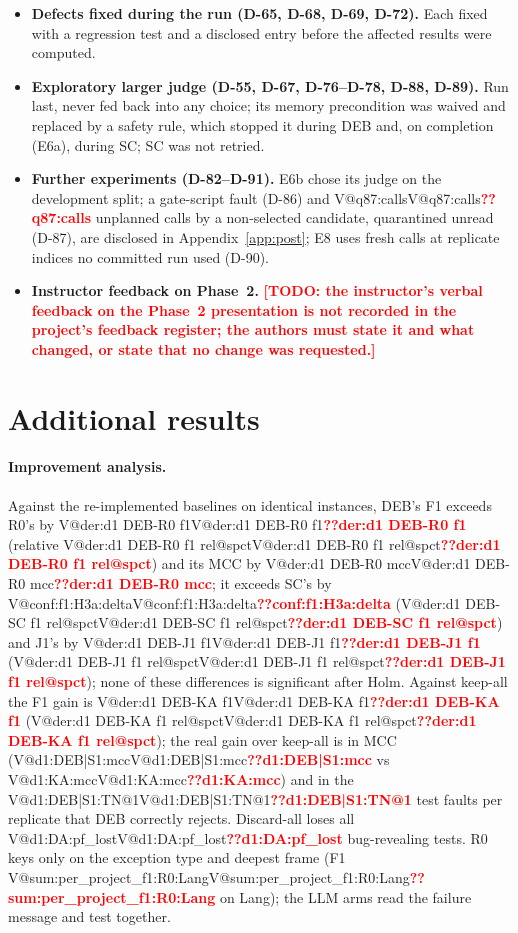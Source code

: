 \documentclass[pdflatex,iicol,sn-mathphys-num]{sn-jnl}
\makeatletter
\newcommand{\V}[1]{\ifcsname V@#1\endcsname\csname V@#1\endcsname\else\textbf{\textcolor{red}{??#1}}\fi}
\newcommand{\TODO}[1]{\textbf{\textcolor{red}{[TODO: #1]}}}
\makeatother
\begin{document}
\begin{appendices}
\begin{itemize}
\item \textbf{Defects fixed during the run (D-65, D-68, D-69, D-72).} Each fixed with a regression test and a disclosed entry before the affected results were computed.
\item \textbf{Exploratory larger judge (D-55, D-67, D-76--D-78, D-88, D-89).} Run last, never fed back into any choice; its memory precondition was waived and replaced by a safety rule, which stopped it during DEB and, on completion (E6a), during SC; SC was not retried.
\item \textbf{Further experiments (D-82--D-91).} E6b chose its judge on the development split; a gate-script fault (D-86) and \V{q87:calls} unplanned calls by a non-selected candidate, quarantined unread (D-87), are disclosed in Appendix~\ref{app:post}; E8 uses fresh calls at replicate indices no committed run used (D-90).
\item \textbf{Instructor feedback on Phase~2.} \TODO{the instructor's verbal feedback on the Phase~2 presentation is not recorded in the project's feedback register; the authors must state it and what changed, or state that no change was requested.}
\end{itemize}

\section{Additional results}\label{app:extra}

\paragraph{Improvement analysis.} Against the re-implemented baselines on identical instances, DEB's F1 exceeds R0's by \V{der:d1 DEB-R0 f1} (relative \V{der:d1 DEB-R0 f1 rel@spct}) and its MCC by \V{der:d1 DEB-R0 mcc}; it exceeds SC's by \V{conf:f1:H3a:delta} (\V{der:d1 DEB-SC f1 rel@spct}) and J1's by \V{der:d1 DEB-J1 f1} (\V{der:d1 DEB-J1 f1 rel@spct}); none of these differences is significant after Holm. Against keep-all the F1 gain is \V{der:d1 DEB-KA f1} (\V{der:d1 DEB-KA f1 rel@spct}); the real gain over keep-all is in MCC (\V{d1:DEB|S1:mcc} vs \V{d1:KA:mcc}) and in the \V{d1:DEB|S1:TN@1} test faults per replicate that DEB correctly rejects. Discard-all loses all \V{d1:DA:pf_lost} bug-revealing tests. R0 keys only on the exception type and deepest frame (F1 \V{sum:per_project_f1:R0:Lang} on Lang); the LLM arms read the failure message and test together.


\end{appendices}
\end{document}
